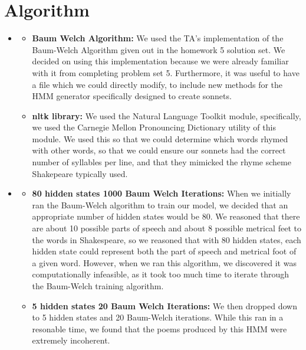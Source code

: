 \section{Algorithm}
\medskip
\begin{itemize}

    \item {}
    \begin{itemize}
    \item \textbf{Baum Welch Algorithm:} We used the TA's implementation of the Baum-Welch Algorithm given out in the homework 5 solution set. We decided on using this implementation because we were already familiar with it from completing problem set 5. Furthermore, it was useful to have a file which we could directly modify, to include new methods for the HMM generator specifically designed to create sonnets.

    \item \textbf{nltk library:} We used the Natural Language Toolkit module, specifically, we used the Carnegie Mellon Pronouncing Dictionary utility of this module. We used this so that we could determine which words rhymed with other words, so that we could ensure our sonnets had the correct number of syllables per line, and that they mimicked the rhyme scheme Shakepeare typically used.
    \end{itemize}

    \item {}

    \begin{itemize}
    \item \textbf{80 hidden states 1000 Baum Welch Iterations:} When we initially ran the Baum-Welch algorithm to train our model, we decided that an appropriate number of hidden states would be 80. We reasoned that there are about 10 possible parts of speech and about 8 possible metrical feet to the words in Shakespeare, so we reasoned that with 80 hidden states, each hidden state could represent both the part of speech and metrical foot of a given word. However, when we ran this algorithm, we discovered it was computationally infeasible, as it took too much time to iterate through the Baum-Welch training algorithm.

    \item \textbf{5 hidden states 20 Baum Welch Iterations:} We then dropped down to 5 hidden states and 20 Baum-Welch iterations. While this ran in a resonable time, we found that the poems produced by this HMM were extremely incoherent.


\end{itemize}
\end{itemize}
